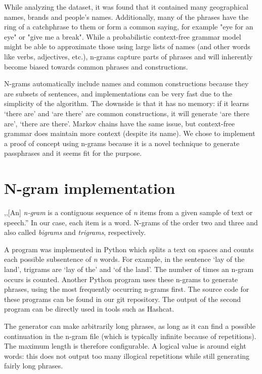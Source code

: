 \documentclass{article}
\begin{document}
While analyzing the dataset, it was found that it contained many geographical
names, brands and people's names. Additionally, many of the phrases have the
ring of a catchphrase to them or form a common saying, for example "eye for an
eye" or "give me a break". While a probabilistic context-free grammar model
might be able to approximate those using large lists of names (and other words
like verbs, adjectives, etc.), n-grams capture parts of phrases and will
inherently become biased towards common phrases and constructions.

N-grams automatically include names and common constructions because they are
subsets of sentences, and implementations can be very fast due to the
simplicity of the algorithm. The downside is that it has no memory: if it
learns `there are' and `are there' are common constructions, it will generate
`are there are', `there are there'. Markov chains have the same issue, but
context-free grammar does maintain more context (despite its name). We chose to
implement a proof of concept using n-grams because it is a novel technique to
generate passphrases and it seems fit for the purpose.


\section{N-gram implementation}\label{sec:implementation}

,,[An] {\it n-gram} is a contiguous sequence of {\it n} items from a given
sample of text or speech.''\cite{wiki-ngram} In our case, each item is a word.
N-grams of the order two and three and also called {\it bigrams} and {\it
trigrams}, respectively.

A program was implemented in Python which splits a text on spaces and counts
each possible subsentence of {\it n} words. For example, in the sentence `lay
of the land', trigrams are `lay of the' and `of the land'. The number of times
an n-gram occurs is counted. Another Python program uses these n-grams to
generate phrases, using the most frequently occurring n-grams first. The source
code for these programs can be found in our git repository\cite{git}. The
output of the second program can be directly used in tools such as Hashcat.

The generator can make arbitrarily long phrases, as long as it can find a
possible continuation in the n-gram file (which is typically infinite because
of repetitions). The maximum length is therefore configurable. A logical value
is around eight words: this does not output too many illogical repetitions
while still generating fairly long phrases.
\end{document}
